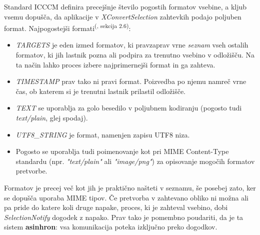 \documentclass[12pt, A4]{article}
\begin{document}
	
	Standard ICCCM definira precejšnje število pogostih formatov vsebine, a kljub vsemu dopušča, da aplikacije v \textit{XConvertSelection} zahtevkih podajo poljuben format.
	Najpogostejši formati\textsuperscript{(\cite{icccm}, sekcija 2.6)}:
	\begin{itemize}
		\item \textit{TARGETS} je eden izmed formatov, ki pravzaprav vrne \textit{seznam} vseh ostalih formatov, ki jih lastnik pozna ali podpira za trenutno vsebino v odložišču. Na ta način lahko proces izbere najprimernejši format in ga zahteva.
		\item \textit{TIMESTAMP} prav tako ni pravi format. Poizvedba po njemu namreč vrne čas, ob katerem si je trenutni lastnik prilastil odložišče.
		
		\item \textit{TEXT} se uporablja za golo besedilo v poljubnem kodiranju (pogosto tudi \textit{text/plain}, glej spodaj).
		\item \textit{UTF8\_STRING} je format, namenjen zapisu UTF8 niza.
		\item Pogosto se uporablja tudi poimenovanje kot pri MIME Content-Type standardu (npr. \textit{"text/plain"} ali \textit{"image/png"}) za opisovanje mogočih formatov pretvorbe.
	\end{itemize}
	
	Formatov je precej več kot jih je praktično našteti v seznamu, še posebej zato, ker se dopušča uporaba MIME tipov. Če pretvorba v zahtevano obliko ni možna ali pa pride do katere koli druge napake, proces, ki je zahteval vsebino, dobi \textit{SelectionNotify} dogodek z napako. Prav tako je pomembno poudariti, da je ta sistem \textbf{asinhron}: vsa komunikacija poteka izključno preko dogodkov.
	
\end{document}
